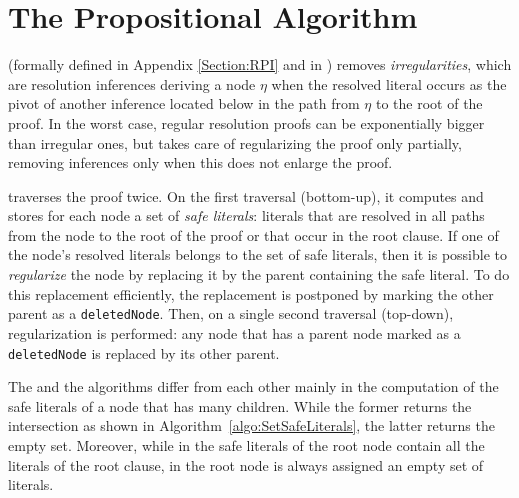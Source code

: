 \section{The Propositional Algorithm}

{\RPI} (formally defined in Appendix \ref{Section:RPI} and in \cite{LURPI}) removes \emph{irregularities}, which are resolution inferences deriving a node $\eta$ when the resolved literal occurs as the pivot of another inference located below in the path from $\eta$ to the root of the proof. In the worst case, regular resolution proofs can be exponentially bigger than irregular ones, but {\RPI} takes care of regularizing the proof only partially, removing inferences only when this does not enlarge the proof.

{\RPI} traverses the proof twice. On the first traversal (bottom-up), it computes and stores for each node a set of \emph{safe literals}: literals that are resolved in all paths from the node to the root of the proof or that occur in the root clause. If one of the node's resolved literals belongs to the set of safe literals, then it is possible to \emph{regularize} the node by replacing it by the parent containing the safe literal. To do this replacement efficiently, the replacement is postponed by marking the other parent as a \texttt{deletedNode}. Then, on a single second traversal (top-down), regularization is performed: any node that has a parent node marked as a \texttt{deletedNode} is replaced by its other parent.

The {\RPI} and the {\RP} algorithms differ from each other mainly in the
computation of the safe literals of a node that has many children. While the former 
returns the intersection as shown in Algorithm~\ref{algo:SetSafeLiterals}, the latter
returns the empty set. 
Moreover, while in {\RPI} the safe literals of the root node contain all the literals of the root clause, in {\RP} the root node is always assigned an empty set of literals. 